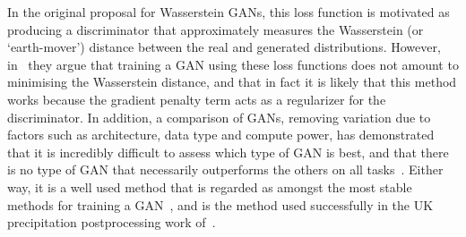 \documentclass[../main.tex]{subfiles}
\begin{document}
In the original proposal for Wasserstein GANs, this loss function is motivated as producing a discriminator that approximately measures the Wasserstein (or `earth-mover') distance between the real and generated distributions. However, in~\cite{stanczuk_wasserstein_2021} they argue that training a GAN using these loss functions does not amount to minimising the Wasserstein distance, and that in fact it is likely that this method works because the gradient penalty term acts as a regularizer for the discriminator. In addition, a comparison of GANs, removing variation due to factors such as architecture, data type and compute power, has demonstrated that it is incredibly difficult to assess which type of GAN is best, and that there is no type of GAN that necessarily outperforms the others on all tasks~\citep{lucic_are_2018}. Either way, it is a well used method that is regarded as amongst the most stable methods for training a GAN~\citep{creswell_generative_2018}, and is the method used successfully in the UK precipitation postprocessing work of~\cite{harris_generative_2022}.

\ifSubfilesClassLoaded{%
    
    

}{}
\end{document}
